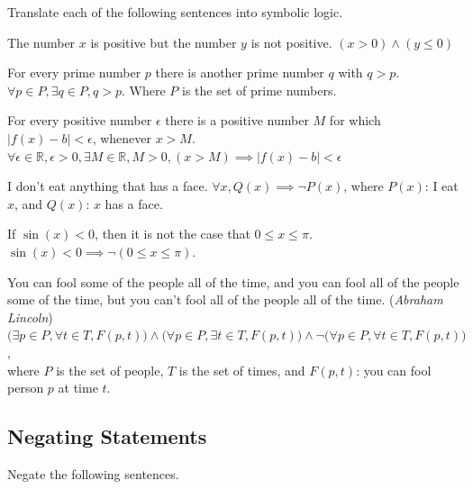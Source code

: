 \documentclass[DIN, pagenumber=false, fontsize=11pt, parskip=half]{scrartcl}
\begin{document}
\begin{exercise}{}
    Translate each of the following sentences into symbolic logic.
\end{exercise}

\begin{problems}
    \problem The number $x$ is positive but the number $y$ is not positive.
    \answer $(x > 0) \land (y \leq 0)$

    \problem For every prime number $p$ there is another prime number $q$ with $q > p$.
    \answer $\forall p \in P, \exists q \in P, q > p$. Where $P$ is the set of prime numbers.

    \problem For every positive number $\epsilon$ there is a positive number $M$ for which $|f(x) - b| < \epsilon$, whenever $x > M$.
    \answer $\forall \epsilon \in \mathbb{R}, \epsilon > 0, \exists M \in \mathbb{R}, M > 0, (x > M) \implies |f(x) - b| < \epsilon$

    \problem I don't eat anything that has a face.
    \answer $\forall x, Q(x) \implies \lnot P(x)$, where $P(x)$: I eat $x$, and $Q(x)$: $x$ has a face.

    \problem If $\sin(x) < 0$, then it is not the case that $0 \leq x \leq \pi$.
    \answer $\sin(x) < 0 \implies \lnot(0 \leq x \leq \pi)$.

    \problem You can fool some of the people all of the time, and you can fool all of the people some of the time, but you can't fool all of the people all of the time. (\textit{Abraham Lincoln})
    \answer $\big(\exists p \in P, \forall t \in T, F(p,t)\big) \land
    \big(\forall p \in P, \exists t \in T, F(p,t)\big) \land
    \lnot\big(\forall p \in P, \forall t \in T, F(p,t)\big)$,\\
    where $P$ is the set of people, $T$ is the set of times, and $F(p,t)$: you can fool
    person $p$ at time $t$.
\end{problems}

\subsection{Negating Statements}

\begin{exercise}{}
    Negate the following sentences.
\end{exercise}
\end{document}

